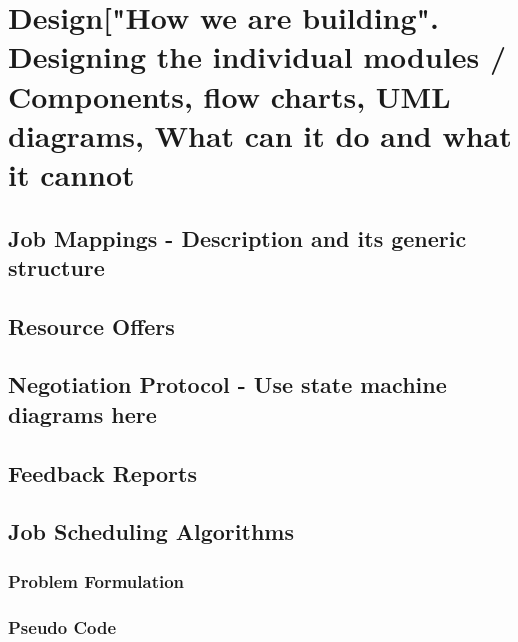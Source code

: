 \chapter{Design["How we are building". Designing the individual modules / Components, flow charts, UML diagrams, What can it do and what it cannot}\label{chapter:ischeduler}
\section{Job Mappings - Description and its generic structure}
\section{Resource Offers}
\section{Negotiation Protocol - Use state machine diagrams here}
\section{Feedback Reports}
\section{Job Scheduling Algorithms}
\subsection{Problem Formulation}
\subsection{Pseudo Code}
